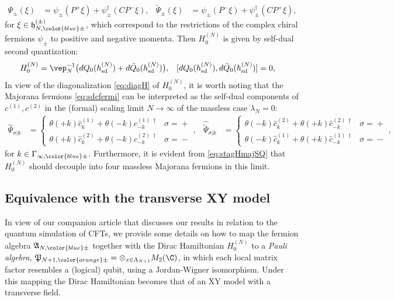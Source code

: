 \documentclass[a4paper, 11pt]{article}
\newcommand{\fA}{\mathfrak{A}}\newcommand{\cA}{\mathcal{A}}\newcommand{\dA}{\mathds{A}}\newcommand{\sA}{\mathscr{A}}
\newcommand{\fh}{\mathfrak{h}}
\newcommand{\fP}{\mathfrak{P}}\newcommand{\cP}{\mathcal{P}}\newcommand{\dP}{\mathds{P}}\newcommand{\sP}{\mathscr{P}}
\DeclareMathOperator{\1}{\mathds{1}}
\DeclareMathOperator{\sd}{sd}
\begin{document}
\begin{align}
\label{eq:sdcfermi}
\Psi_{\pm}(\xi) & = \psi_{\pm}(P^{+}\xi) + \psi^{\dag}_{\pm}(CP^{-}\xi), & \tilde{\Psi}_{\pm}(\xi) & = \psi_{\pm}(P^{-}\xi) + \psi^{\dag}_{\pm}(CP^{+}\xi),
\end{align}
for $\xi\in\fh^{(\pm)}_{N,{\color{blue}\pm}}$, which correspond to the restrictions of the complex chiral fermions $\psi_{\pm}$ to positive and negative momenta. Then $H^{(N)}_{0}$ is given by self-dual second quantization:
\begin{align}
\label{eq:stagHmajSQ}
H^{(N)}_{0} & = \vep_{N}^{-1}\big(dQ_{0}(h^{(N)}_{\sd}) + d\tilde{Q}_{0}(h^{(N)}_{\sd})\big), & [dQ_{0}(h^{(N)}_{\sd}),d\tilde{Q}_{0}(h^{(N)}_{\sd})] & = 0,
\end{align}
In view of the diagonalization \eqref{eq:diagH} of $H^{(N)}_{0}$, it is worth noting that the Majorana fermions \eqref{eq:sdcfermi} can be interpreted as the self-dual components of $c^{(1)}, c^{(2)}$ in the (formal) scaling limit $N\rightarrow\infty$ of the massless case $\lambda_{N}=0$:
\begin{align}
\label{eq:sdcfermidiag}
\hat{\Psi}_{\sigma|k} &\!=\!\left\{\begin{matrix} \theta(+k)\hat{c}^{(1)}_{k}+\theta(-k)\hat{c}^{(1)\!\!\ \dag}_{-k} & \sigma\!=\!+ \\[0.1cm] \theta(+k)\hat{c}^{(2)}_{k}+\theta(-k)\hat{c}^{(2)\!\!\ \dag}_{-k} & \sigma\!=\!- \end{matrix}\right., & \hat{\tilde{\Psi}}_{\sigma|k} &\!=\!\left\{\begin{matrix} \theta(-k)\hat{c}^{(2)}_{k}+\theta(+k)\hat{c}^{(2)\!\!\ \dag}_{-k} & \sigma\!=\!+ \\[0.1cm] \theta(-k)\hat{c}^{(1)}_{k}+\theta(+k)\hat{c}^{(1)\!\!\ \dag}_{-k} & \sigma\!=\!- \end{matrix}\right.,
\end{align}
for $k\in\Gamma_{\infty,{\color{blue}\pm}}$. Furthermore, it is evident from \eqref{eq:stagHmajSQ} that $H^{(N)}_{0}$ should decouple into four massless Majorana fermions in this limit.

\subsection{Equivalence with the transverse XY model}
\label{sec:xymodel}
In view of our companion article \cite{OsborneCFTsim} that discusses our results in relation to the quantum simulation of CFTs, we provide some details on how to map the fermion algebra $\fA_{N,{\color{blue}\pm}}$ together with the Dirac Hamiltonian $H^{(N)}_{0}$ to a \textit{Pauli algebra}, $\fP_{N+1,{\color{orange}\pm}}=\otimes_{x\in\Lambda_{N+1}}M_{2}(\C)$, in which each local matrix factor resembles a (logical) qubit, using a Jordan-Wigner isomorphism. Under this mapping the Dirac Hamiltonian becomes that of an XY model with a transverse field.
\end{document}
